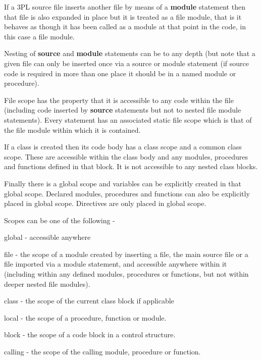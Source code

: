         If a 3PL source file inserts another file by means of a {\bf module}
        statement then that file is also expanded in place but it is treated
        as a file module, that is it behaves as though it has been called as a
        module at that point in the code, in this case a file module.

        Nesting of {\bf source} and {\bf module} statements can be to any
        depth (but note that a given file can only be inserted once via a
        source or module statement (if source code is required in more than one
        place it should be in a named module or procedure).

        File scope has the property that it is accessible to any code within
        the file (including code inserted by {\bf source} statements but
        not to nested file module statements). Every statement has an associated
        static file scope which is that of the file module within which it is
        contained.
        
        If a class is created then its code body has a class scope and a common
        class scope. These are accessible within the class body and any modules,
        procedures and functions defined in that block. It is not accessible to
        any nested class blocks.

        Finally there is a global scope and variables can be explicitly created
        in that global scope. Declared modules, procedures and functions can
        also be explicitly placed in global scope. Directives are only placed
        in global scope.

        Scopes can be one of the following -
        \blist
        \item   global - accessible anywhere
        \item   file - the scope of a module created by inserting a file, the
                main source file or a file imported via a module statement,
                and accessible anywhere within it (including within any
                defined modules, procedures or functions, but not within
                deeper nested file modules).
        \item   class - the scope of the current class block if applicable
        \item   local - the scope of a procedure, function or module.
        \item   block - the scope of a code block in a control structure.
        \item   calling - the scope of the calling module, procedure or
                function.
        \blend
        
